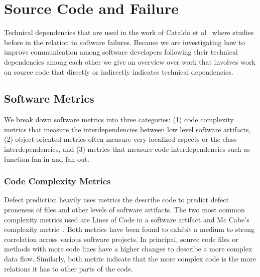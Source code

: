 


\section{Source Code and Failure}
Technical dependencies that are used in the work of Cataldo et al~\cite{cataldo:cscw:2006} where studies before in the relation to software failures.
Because we are investigating how to improve communication among software developers following their technical dependencies among each other we give an overview over work that involves work on source code that directly or indirectly indicates technical dependencies. 


\subsection{Software Metrics}
\label{chap:6:measure}
We break down software metrics into three categories:
(1) code complexity metrics that measure the interdependencies between low level software artifacts,
(2) object oriented metrics often measure very localized aspects or the class interdependencies,
and (3) metrics that measure code interdependencies such as function fan in and fan out.

\subsubsection{Code Complexity Metrics}
Defect prediction heavily uses metrics the describe code to predict defect proneness of files and other levels of software artifacts.
%
The two most common complexity metrics used are Lines of Code in a software artifact and Mc Cabe's complexity metric~\cite{mccabe:ieee:1976}.
Both metrics have been found to exhibit a medium to strong correlation across various software projects.
In principal, source code files or methods with more code lines have a higher changes to describe a more complex data flow.
Similarly, both metric indicate that the more complex code is the more relations it has to other parts of the code.

